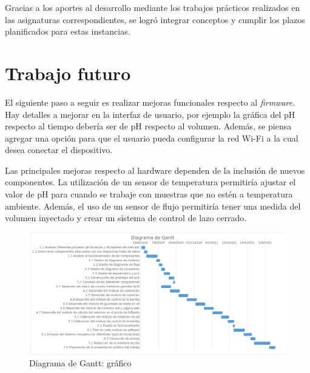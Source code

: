 Gracias a los aportes al desarrollo mediante los trabajos prácticos realizados en las asignaturas correspondientes, se logró integrar conceptos y cumplir los plazos planificados para estas instancias.

%
%


\section{Trabajo futuro}

El siguiente paso a seguir es realizar mejoras funcionales respecto al \textit{firmware}. Hay detalles a mejorar en la interfaz de usuario, por ejemplo la gráfica del pH respecto al tiempo debería ser de pH respecto al volumen. Además, se piensa agregar una opción para que el usuario pueda configurar la red Wi-Fi a la cual desea conectar el dispositivo. 

Las principales mejoras respecto al hardware dependen de la inclusión de nuevos componentes. La utilización de un sensor de temperatura permitiría ajustar el valor de pH para cuando se trabaje con muestras que no estén a temperatura ambiente. Además, el uso de un sensor de flujo permitiría tener una medida del volumen inyectado y crear un sistema de control de lazo cerrado.


\begin{landscape}
	\begin{figure}[p]
	\centering 
	\includegraphics[width=1.5\textwidth]{./Figures/DiagramaGantt.png}
	\caption{Diagrama de Gantt: gráfico}
	\label{fig:diagramaGantt}
	\end{figure}
\end{landscape}
